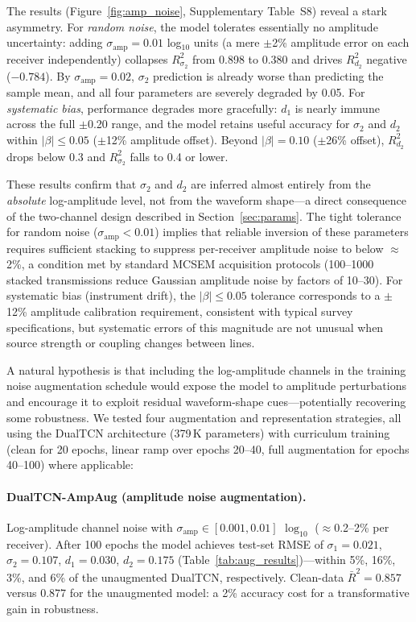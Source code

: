 \documentclass[journal]{IEEEtran}
\begin{document}
The results (Figure~\ref{fig:amp_noise}, Supplementary Table~S8)
reveal a stark asymmetry. For \emph{random noise}, the model
tolerates essentially no amplitude uncertainty: adding
$\sigma_\mathrm{amp} = 0.01$ log$_{10}$ units (a mere $\pm$2\%
amplitude error on each receiver independently) collapses
$R^2_{\sigma_2}$ from 0.898 to 0.380 and drives $R^2_{d_2}$
negative ($-0.784$). By $\sigma_\mathrm{amp} = 0.02$, $\sigma_2$
prediction is already worse than predicting the sample mean, and
all four parameters are severely degraded by 0.05. For
\emph{systematic bias}, performance degrades more gracefully:
$d_1$ is nearly immune across the full $\pm$0.20 range, and the
model retains useful accuracy for $\sigma_2$ and $d_2$ within
$|\beta| \leq 0.05$ ($\pm$12\% amplitude offset). Beyond
$|\beta| = 0.10$ ($\pm$26\% offset), $R^2_{d_2}$ drops below
0.3 and $R^2_{\sigma_2}$ falls to 0.4 or lower.

These results confirm that $\sigma_2$ and $d_2$ are inferred
almost entirely from the \emph{absolute} log-amplitude level,
not from the waveform shape---a direct consequence of the
two-channel design described in Section~\ref{sec:params}. The tight
tolerance for random noise ($\sigma_\mathrm{amp} < 0.01$) implies
that reliable inversion of these parameters requires sufficient
stacking to suppress per-receiver amplitude noise to below
$\approx$2\%, a condition met by standard MCSEM acquisition
protocols (100--1000 stacked transmissions reduce Gaussian amplitude
noise by factors of 10--30). For systematic bias (instrument drift),
the $|\beta| \leq 0.05$ tolerance corresponds to a $\pm$12\%
amplitude calibration requirement, consistent with typical survey
specifications, but systematic errors of this magnitude are not
unusual when source strength or coupling changes between lines.

A natural hypothesis is that including the log-amplitude channels in
the training noise augmentation schedule would expose the model to
amplitude perturbations and encourage it to exploit residual
waveform-shape cues---potentially recovering some robustness.
We tested four augmentation and representation strategies, all using
the DualTCN architecture (379\,K parameters) with curriculum training
(clean for 20 epochs, linear ramp over epochs 20--40, full
augmentation for epochs 40--100) where applicable:

\paragraph{DualTCN-AmpAug (amplitude noise augmentation).}
Log-amplitude channel noise with
$\sigma_\mathrm{amp} \in [0.001, 0.01]$ $\log_{10}$
($\approx$0.2--2\% per receiver).  After 100 epochs the model
achieves test-set RMSE of $\sigma_1 = 0.021$, $\sigma_2 = 0.107$,
$d_1 = 0.030$, $d_2 = 0.175$ (Table~\ref{tab:aug_results})---within
5\%, 16\%, 3\%, and 6\% of the unaugmented DualTCN, respectively.
Clean-data $\bar{R}^2 = 0.857$ versus $0.877$ for the unaugmented
model: a 2\% accuracy cost for a transformative gain in robustness.
\end{document}
